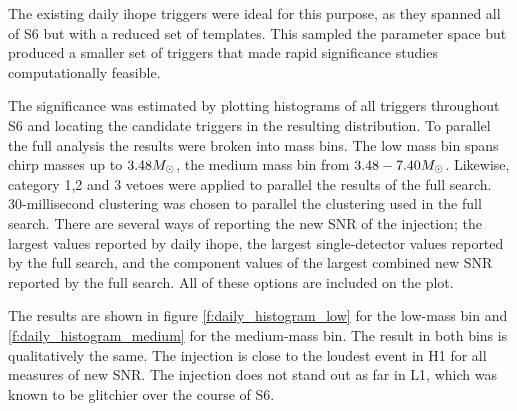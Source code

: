 The existing daily ihope triggers were ideal for this purpose, as they
spanned all of S6 but with a reduced set of templates.  This sampled the
parameter space but produced a smaller set of triggers that made
rapid significance studies computationally feasible.

The significance was estimated by plotting histograms of all triggers
throughout S6 and locating the candidate triggers in the resulting
distribution.  To parallel the full analysis the results were broken
into mass bins.  The low mass bin spans chirp masses up to
$3.48M_\odot$, the medium mass bin from $3.48-7.40 M_\odot$.  Likewise,
category 1,2 and 3 vetoes were applied to parallel the results of the
full search.  30-millisecond clustering was chosen to parallel the
clustering used in the full search.  There are several ways of
reporting the new SNR of the injection; the largest values reported by
daily ihope, the largest single-detector values reported by the full
search, and the component values of the largest combined new SNR
reported by the full search.  All of these options are included on the
plot.

The results are shown in figure \ref{f:daily_histogram_low} for the
low-mass bin and \ref{f:daily_histogram_medium} for the medium-mass
bin.  The result in both bins is qualitatively the same.  The
injection is close to the loudest event in H1 for all measures of new
SNR.  The injection does not stand out as far in L1, which was known
to be glitchier over the course of S6.


